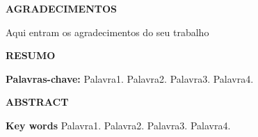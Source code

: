 \documentclass[12pt,a4paper]{article}
\begin{document}
\begin{titlepage}
    \begin{center}
        \textbf{AGRADECIMENTOS}
    \end{center}
    \vspace{3\baselineskip}
    \setlength{\parindent}{1.25cm} %
    \onehalfspacing %
    Aqui entram os agradecimentos do seu trabalho
    
\end{titlepage}


\begin{titlepage}
    \centering
    \singlespacing
    \vspace*{3\baselineskip}

    \textbf{\Large RESUMO}

    \vspace{3\baselineskip}

    \singlespacing
    \lipsum[1] %
    \par

    \vspace{2\baselineskip}

    \textbf{Palavras-chave:} Palavra1. Palavra2. Palavra3. Palavra4.

\end{titlepage}

\begin{titlepage}
    \centering
    \singlespacing
    \vspace*{3\baselineskip}

    \textbf{\Large ABSTRACT}

    \vspace{3\baselineskip}

    \singlespacing
    \lipsum[1] %
    \par

    \vspace{2\baselineskip}

    \textbf{Key words} Palavra1. Palavra2. Palavra3. Palavra4.

\end{titlepage}

\renewcommand{\cftfigpresnum}{Figura } %
\renewcommand{\cftfigaftersnum}{ --} %
\setlength{\cftfignumwidth}{5em} %
\end{document}
